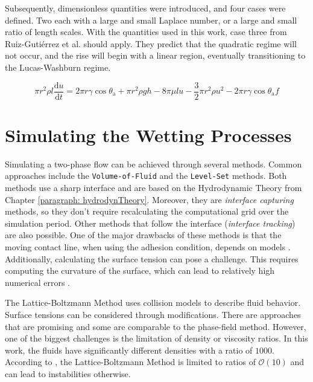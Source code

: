 Subsequently, dimensionless quantities were introduced, and four cases were defined. Two each with a large and small Laplace number, or a large and small ratio of length scales. With the quantities used in this work, case three from Ruiz-Gutiérrez et al. \cite{ruiz-gutierrez2022LongCrossoverDynamics} should apply. They predict that the quadratic regime will not occur, and the rise will begin with a linear region, eventually transitioning to the Lucas-Washburn regime.


\begin{equation}
    \pi r^2\rho l\frac{\mathrm{d}u}{\mathrm{d}t}=2\pi r\gamma\cos\theta_{\mathrm{a}}+\pi r^2\rho gh-8\pi\mu lu-\frac{3}{2}\pi r^2\rho u^2-2\pi r\gamma\cos\theta_{\mathrm{a}}f
\end{equation}


\section{Simulating the Wetting Processes}
Simulating a two-phase flow can be achieved through several methods. Common approaches include the \texttt{Volume-of-Fluid} and the \texttt{Level-Set} methods. Both methods use a sharp interface and are based on the Hydrodynamic Theory from Chapter \ref{paragraph: hydrodynTheory}. Moreover, they are \textit{interface capturing} methods, so they don't require recalculating the computational grid over the simulation period. Other methods that follow the interface (\textit{interface tracking}) are also possible. One of the major drawbacks of these methods is that the moving contact line, when using the adhesion condition, depends on models \cite{carlsonCapillarityDynamicWetting2012}. Additionally, calculating the surface tension can pose a challenge. This requires computing the curvature of the surface, which can lead to relatively high numerical errors \cite{jamshidi2019SuitabilityPhasefieldAlgebraic,hagg2019DirekteNumerischeSimulation}.

The Lattice-Boltzmann Method uses collision models to describe fluid behavior. Surface tensions can be considered through modifications. There are approaches that are promising and some are comparable to the phase-field method. However, one of the biggest challenges is the limitation of density or viscosity ratios. In this work, the fluids have significantly different densities with a ratio of $1000$. According to \cite{chenCriticalReviewPseudopotential2014}, the Lattice-Boltzmann Method is limited to ratios of $\mathcal{O}(10)$ and can lead to instabilities otherwise.

